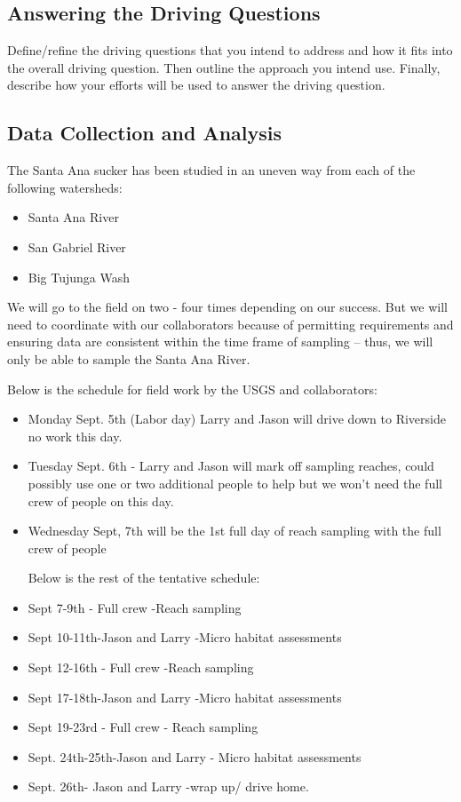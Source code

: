 \documentclass{tufte-handout}\usepackage[]{graphicx}\usepackage[]{color}
\begin{document}

\subsection{Answering the Driving Questions}

Define/refine the driving questions that you intend to address and how it fits into the overall driving question. Then outline the approach you intend use. Finally, describe how your efforts will be used to answer the driving question.

\subsection{Data Collection and Analysis}

The Santa Ana sucker has been studied in an uneven way from each of the following watersheds: 

\begin{itemize}
  \item Santa Ana River
  \item San Gabriel River
  \item Big Tujunga Wash
\end{itemize}

We will go to the field on two - four times depending on our success. But we will need to coordinate with our collaborators because of permitting requirements and ensuring data are consistent within the time frame of sampling -- thus, we will only be able to sample the Santa Ana River.

Below is the schedule for field work by the USGS and collaborators:

\begin{itemize}
\item Monday Sept. 5th (Labor day) Larry and Jason will drive down to Riverside no work this day.
\item Tuesday Sept. 6th - Larry and Jason will mark off sampling reaches, could possibly use one or two additional people to help but we won't need the full crew of people on this day. 
\item Wednesday Sept, 7th will be the 1st full day of reach sampling with the full crew of people

Below is the rest of the tentative schedule:

\item Sept 7-9th - Full crew -Reach sampling
\item Sept 10-11th-Jason and Larry -Micro habitat assessments
\item Sept 12-16th - Full crew -Reach sampling
\item Sept 17-18th-Jason and Larry -Micro habitat assessments

\item Sept 19-23rd - Full crew - Reach sampling
\item Sept. 24th-25th-Jason and Larry - Micro habitat assessments
\item Sept. 26th- Jason and Larry -wrap up/ drive home.
\end{itemize}
\end{document}
